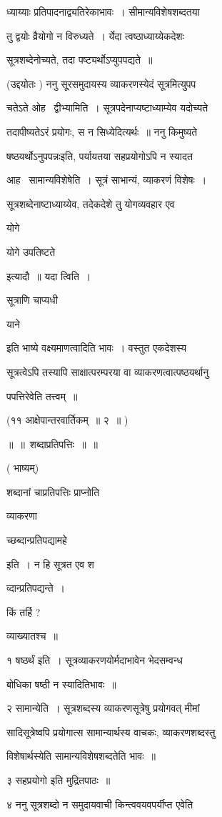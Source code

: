 \documentclass[11pt, openany]{book}
\begin{document}
ध्याय्याः प्रतिपादनाद्व्यतिरेकाभावः~। सीमान्यविशेषशब्दतया 

तु द्वयोः व्रैयोगो न विरुध्यते~। र्येदा त्वष्ठाध्याय्येकदेशः 

सूत्रशब्देनोच्यते, तदा पष्ट्यर्थोऽप्युपपद्यते~॥ 

(उद्दयोतः ) ननु सू्रसमुदायस्य व्याकरणस्येदं सूत्रमित्युपप \textendash\ 

चतेऽते ओह \textendash\ द्वीभ्यामिति~। सूत्रपदेनाप्यष्टाध्याम्येव यदोच्यते 

तदापीष्यतेऽरं प्रयोगः, स न सिध्येदित्यर्थः~॥ ननु किमुष्यते \textendash\ 

{\qt षष्ठयर्थोऽनुपपन्नः}इति, पर्यायतया सहप्रयोगोऽपि न स्यादत 

आह \textendash\ सामान्यविशेषेति~। सूत्रं साभान्यं, व्याकरणं विशेषः~। 

सूत्रशब्देनाष्टाध्याय्येव, तदेकदेशे तु योगव्यवहार एव {\qt योगे 

योगे उपतिष्टते} इत्यादौ~॥ यदा त्विति~। {\qt सूत्राणि चाप्यधी \textendash\ 

याने} इति भाष्ये वक्ष्यमाणत्वादिति भावः~। वस्तुत एकदेशस्य 

सूत्रत्वेऽपि तस्यापि साक्षात्परम्परया वा व्याकरणत्वात्पष्ठयर्थानु \textendash\ 

पपत्तिरेवेति तत्त्वम्~॥ 

(११ आक्षेपान्तरवार्तिकम्~॥ २~॥ ) 

॥~॥~शब्दाप्रतिपत्तिः~॥~॥ 

( भाष्यम्) 

शब्दानां चाप्रतिपत्तिः प्राप्नोति \textendash\ {\qt व्याकरणा \textendash\ 

च्छब्दान्प्रतिपद्यामहे} इति~। न हि सूत्रत एव श \textendash\ 

व्दान्प्रतिपद्यन्ते~। 

किं तर्हि ? 

व्याख्यातश्च~॥ 



१ षष्ठर्थं इति~। सूत्रव्याकरणयोर्मदाभावेन भेदसम्वन्ध \textendash\ 

बोधिका षष्ठी न स्यादितिभावः~॥

२ सामान्येति~। सूत्रशब्दस्य व्याकरणसूत्रेषु प्रयोगवत् मीमां \textendash\ 

सादिसूत्रेष्वपि प्रयोगात्स सामान्यार्थस्य वाचकः, व्याकरणशब्दस्तु 

विशेषार्थस्येति सामान्यविशेषशब्दतेति भावः~॥ 

३ {\qt सहप्रयोगो} इति मुद्रितपाठः~॥ 

४ ननु सूत्रशब्दो न समुदायवाची किन्त्ववयवपर्यीप्त एवेति 
\end{document}
